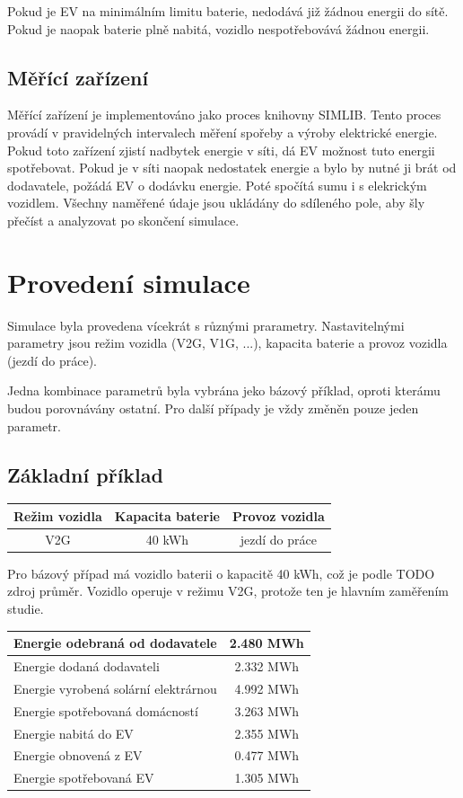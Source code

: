 \documentclass[12pt,a4paper]{article}
\begin{document}
Pokud je EV na minimálním limitu baterie, nedodává již žádnou energii do sítě.
Pokud je naopak baterie plně nabitá, vozidlo nespotřebovává žádnou energii.



\subsection{Měřící zařízení}
Měřící zařízení je implementováno jako proces knihovny SIMLIB.
Tento proces provádí v pravidelných intervalech měření spořeby a výroby elektrické energie.
Pokud toto zařízení zjistí nadbytek energie v síti, dá EV možnost tuto energii spotřebovat.
Pokud je v síti naopak nedostatek energie a bylo by nutné ji brát od dodavatele, požádá EV o dodávku energie.
Poté spočítá sumu i s elekrickým vozidlem.
Všechny naměřené údaje jsou ukládány do sdíleného pole, aby šly přečíst a analyzovat po skončení simulace.

\section{Provedení simulace}

Simulace byla provedena vícekrát s různými prarametry.
Nastavitelnými parametry jsou režim vozidla (V2G, V1G, ...), kapacita baterie a provoz vozidla (jezdí do práce).

Jedna kombinace parametrů byla vybrána jeko bázový příklad,
oproti kterámu budou porovnávány ostatní.
Pro další případy je vždy změněn pouze jeden parametr.

\subsection{Základní příklad}

\bigskip
\begin{tabular}{ | c | c | c | }
\hline
Režim vozidla & Kapacita baterie & Provoz vozidla \\
\hline
V2G & 40 kWh & jezdí do práce \\
\hline
\end{tabular}
\bigskip

Pro bázový případ má vozidlo baterii o kapacitě 40 kWh, což je podle TODO zdroj průměr.
Vozidlo operuje v režimu V2G, protože ten je hlavním zaměřením studie.

\bigskip
\begin{tabular}{ | l | c | }
\hline
Energie odebraná od dodavatele & 2.480 MWh \\
\hline
Energie dodaná dodavateli & 2.332 MWh \\
\hline
Energie vyrobená solární elektrárnou & 4.992 MWh \\
\hline
Energie spotřebovaná domácností & 3.263 MWh \\
\hline
Energie nabitá do EV & 2.355 MWh \\
\hline
Energie obnovená z EV & 0.477 MWh \\
\hline
Energie spotřebovaná EV & 1.305 MWh \\
\hline
\end{tabular}
\bigskip
\end{document}
